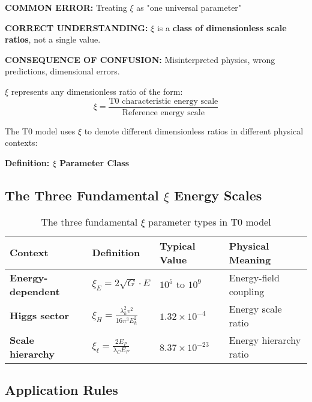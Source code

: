 \documentclass[12pt,a4paper]{article}
\begin{document}
	\begin{tcolorbox}[colback=red!10!white,colframe=red!75!black,title=CRITICAL WARNING: $\xi$ Parameter Confusion]
		\textbf{COMMON ERROR:} Treating $\xi$ as "one universal parameter"
		
		\textbf{CORRECT UNDERSTANDING:} $\xi$ is a \textbf{class of dimensionless scale ratios}, not a single value.
		
		\textbf{CONSEQUENCE OF CONFUSION:} Misinterpreted physics, wrong predictions, dimensional errors.
		
			$\xi$ represents any dimensionless ratio of the form:
		\begin{equation}
			\xi = \frac{\text{T0 characteristic energy scale}}{\text{Reference energy scale}}
		\end{equation}

	
	The T0 model uses $\xi$ to denote different dimensionless ratios in different physical contexts:
	
	\textbf{Definition: $\xi$ Parameter Class}
	\end{tcolorbox}	
	
	
	\subsection{The Three Fundamental $\xi$ Energy Scales}
	
	\begin{table}[htbp]
		\centering
		\begin{tabular}{|p{3cm}|p{4cm}|p{3cm}|p{4cm}|}
			\hline
			\textbf{Context} & \textbf{Definition} & \textbf{Typical Value} & \textbf{Physical Meaning} \\
			\hline
			\textbf{Energy-dependent} & $\xi_E = 2\sqrt{G} \cdot E$ & $10^5$ to $10^9$ & Energy-field coupling \\
			\hline
			\textbf{Higgs sector} & $\xi_H = \frac{\lambda_h^2 v^2}{16\pi^3 E_h^2}$ & $1.32 \times 10^{-4}$ & Energy scale ratio \\
			\hline
			\textbf{Scale hierarchy} & $\xi_\ell = \frac{2E_P}{\lambda_C E_P}$ & $8.37 \times 10^{-23}$ & Energy hierarchy ratio \\
			\hline
		\end{tabular}
		\caption{The three fundamental $\xi$ parameter types in T0 model}
		\label{tab:xi_hierarchy}
	\end{table}
	
	\subsection{Application Rules}
	
\end{document}
